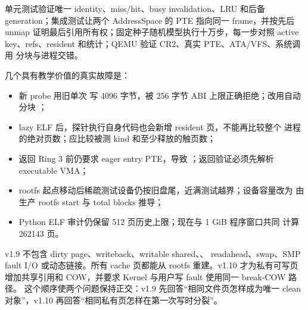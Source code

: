 单元测试验证唯一 identity、miss/hit、busy invalidation、LRU 和后备
generation；集成测试让两个 AddressSpace 的 PTE 指向同一 frame，并按先后
unmap 证明最后引用所有权；固定种子随机模型执行十万步，每一步对照 active
key、refs、resident 和统计；QEMU 验证 CR2、真实 PTE、ATA/VFS、系统调用
分块与进程交错。

几个具有教学价值的真实故障是：

\begin{itemize}
  \item 新 probe 用旧单次  写 4096 字节，被 256 字节 ABI
        上限正确拒绝；改用自动分块 ；
  \item lazy ELF 后，探针执行自身代码也会新增 resident 页，不能再比较整个
       进程的绝对页数；应比较被测 kind 和至少释放的触页数；
  \item 返回 Ring 3 前仍要求 eager entry PTE，导致
        ；返回验证必须先解析 executable VMA；
  \item rootfs 起点移动后稀疏测试设备仍按旧盘尾，近满测试越界；设备容量改为
       由生产 rootfs start 与 total blocks 推导；
  \item Python ELF 审计仍保留 512 页历史上限；现在与 1 GiB 程序窗口共同
       计算 262143 页。
\end{itemize}

v1.9 不包含 dirty page、writeback、writable shared、、
readahead、swap、SMP fault I/O 或动态链接。所有 cache 页都能从 rootfs
重建。v1.10 才为私有可写页增加共享引用和 COW，并要求 Kernel
 与用户写 fault 使用同一 break-COW 路径。
这个顺序使两个问题保持正交：v1.9 先回答“相同文件页怎样成为唯一 clean
对象”，v1.10 再回答“相同私有页怎样在第一次写时分裂”。
